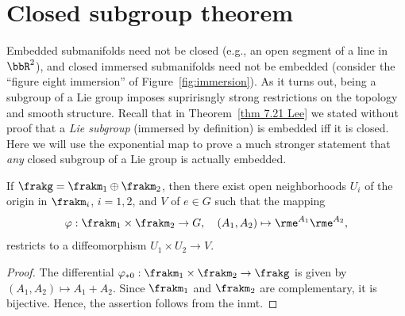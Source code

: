 \section{Closed subgroup theorem}


Embedded submanifolds need not be closed (e.g., an open segment of a line in $\bbR^2$), and closed immersed submanifolds need not be embedded (consider the ``figure eight immersion'' of Figure~\ref{fig:immersion}). As it turns out, being a subgroup of a Lie group imposes supririsngly strong restrictions on the topology and smooth structure. Recall that in Theorem~\ref{thm 7.21 Lee} we stated without proof that a \emph{Lie subgroup} (immersed by definition) is embedded iff it is closed. Here we will use the exponential map to prove a much stronger statement that \emph{any} closed subgroup of a Lie group is actually embedded.


\begin{lem}[{{\cite[Lem.~5.6.7]{RS1}}}]\label{lem 5.6.7 RS1}
    If $\frakg=\frakm_1\oplus\frakm_2$, then there exist open neighborhoods $U_i$ of the origin in $\frakm_i$, $i=1,2$, and $V$ of $e\in G$ such that the mapping
    \[\varphi:\frakm_1\times\frakm_2\to G,\quad (A_1,A_2)\mapsto \rme^{A_1}\rme^{A_2},\]
    restricts to a diffeomorphism $U_1\times U_2\to V$.
\end{lem}
\begin{proof}
    The differential $\varphi_{\ast 0}:\frakm_1\times\frakm_2\to\frakg$ is given by $(A_1,A_2)\mapsto A_1+A_2$. Since $\frakm_1$ and $\frakm_2$ are complementary, it is bijective. Hence, the assertion follows from the \gls{inmt}.
\end{proof}


